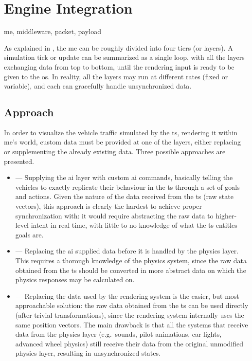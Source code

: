 \chapter{Engine Integration}\label{ch:integration}

\begin{keywords}
	me, middleware, packet, payload
\end{keywords}

As explained in , the \gls{me} can be roughly divided into four tiers (or layers). A simulation tick or update can be summarized as a single loop, with all the layers exchanging data from top to bottom, until the rendering input is ready to be given to the \gls{os}. In reality, all the layers may run at different rates (fixed or variable), and each can gracefully handle unsynchronized data.

\section{Approach}\label{sc:integration:approach}

In order to visualize the vehicle traffic simulated by the \gls{ts}, rendering it within \gls{me}'s world, custom data must be provided at one of the layers, either replacing or supplementing the already existing data. Three possible approaches are presented.

\begin{itemize}
	\item {} --- Supplying the \gls{ai} layer with custom \gls{ai} commands, basically telling the vehicles to exactly replicate their behaviour in the \gls{ts} through a set of goals and actions. Given the nature of the data received from the \gls{ts} (raw state vectors), this approach is clearly the hardest to achieve proper synchronization with: it would require abstracting the raw data to higher-level intent in real time, with little to no knowledge of what the \gls{ts} entitles goals are.
	\item {} --- Replacing the \gls{ai} supplied data before it is handled by the physics layer. This requires a thorough knowledge of the physics system, since the raw data obtained from the \gls{ts} should be converted in more abstract data on which the physics responses may be calculated on.
	\item {} --- Replacing the data used by the rendering system is the easier, but most approachable solution: the raw data obtained from the \gls{ts} can be used directly (after trivial transformations), since the rendering system internally uses the same position vectors. The main drawback is that all the systems that receive data from the physics layer (e.g.\ sounds, pilot animations, car lights, advanced wheel physics) still receive their data from the original unmodified physics layer, resulting in unsynchronized states.
\end{itemize}

